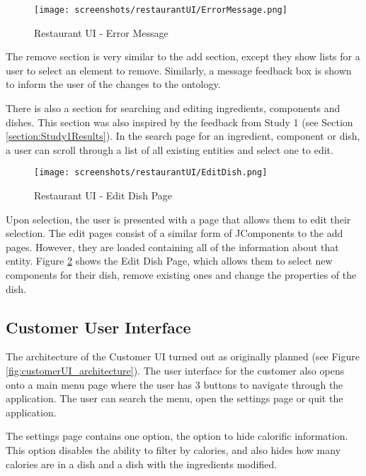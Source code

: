 \begin{figure}[h]
    \centering
    \captionsetup{justification=centering}
    \texttt{[image: screenshots/restaurantUI/ErrorMessage.png]}
    \caption{Restaurant UI - Error Message}
    \label{fig:restaurantUI_error}
\end{figure}

The remove section is very similar to the add section, except they show lists for a user to select an element to remove. Similarly, a message feedback box is shown to inform the user of the changes to the ontology.

There is also a section for searching and editing ingredients, components and dishes. This section was also inspired by the feedback from Study 1 (see Section \ref{section:Study1Results}). In the search page for an ingredient, component or dish, a user can scroll through a list of all existing entities and select one to edit.

\begin{figure}[h]
    \centering
    \captionsetup{justification=centering}
    \texttt{[image: screenshots/restaurantUI/EditDish.png]}
    \caption{Restaurant UI - Edit Dish Page}
    \label{fig:restaurantUI_edit_dish}
\end{figure}

Upon selection, the user is presented with a page that allows them to edit their selection. The edit pages consist of a similar form of JComponents to the add pages. However, they are loaded containing all of the information about that entity. Figure \ref{fig:restaurantUI_edit_dish} shows the Edit Dish Page, which allows them to select new components for their dish, remove existing ones and change the properties of the dish.

\subsection{Customer User Interface}

The architecture of the Customer UI turned out as originally planned (see Figure \ref{fig:customerUI_architecture}). The user interface for the customer also opens onto a main menu page where the user has 3 buttons to navigate through the application. The user can search the menu, open the settings page or quit the application.

The settings page contains one option, the option to hide calorific information. This option disables the ability to filter by calories, and also hides how many calories are in a dish and a dish with the ingredients modified.

